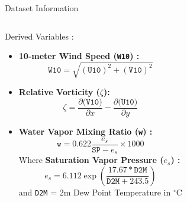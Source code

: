 \documentclass[10pt, aspectratio=169,t,xcolor=table]{beamer}
\begin{document}
\begin{frame}{Dataset Information}
\begin{columns}[t]
		\begin{block}{\small Derived Variables :}
			\begin{itemize}\footnotesize
				\item \textbf{10-meter Wind Speed (\texttt{W10}) :}
				      \footnotesize
				      \begin{equation}
					      \texttt{W10} = \sqrt{(\texttt{U10})^2 + (\texttt{V10})^2}
				      \end{equation}
				\item \textbf{Relative Vorticity (\texttt{$\zeta$}):}
				      \footnotesize
				      \begin{equation}
					      \zeta = \frac{\partial(\texttt{V10)}}{\partial x} - \frac{\partial(\texttt{U10)}}{\partial y}
				      \end{equation}
				\item \textbf{Water Vapor Mixing Ratio (\texttt{w}) :}
				      \footnotesize
				      \begin{equation}
					      \texttt{w} = 0.622 \frac{e_s}{\texttt{SP} - e_s} \times 1000
				      \end{equation}
				      Where \textbf{Saturation Vapor Pressure (\texttt{$e_s$}) :}
				      \footnotesize
				      \begin{equation}
					      e_s = 6.112 \exp\left(\frac{17.67 * \texttt{D2M}}{\texttt{D2M} + 243.5}\right)
				      \end{equation}
				      and \texttt{D2M} = 2m Dew Point Temperature in $^\circ$C
			\end{itemize}
		\end{block}
	\end{columns}
\end{frame}
\end{document}

